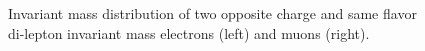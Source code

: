 \begin{figure}[h!]
\centering
{}
\centering
{}
\vspace{-10mm}\caption{Invariant mass distribution of two opposite charge and same flavor di-lepton invariant mass electrons (left) and muons (right).}
\label{fig:realEff_CRs}
\end{figure}


